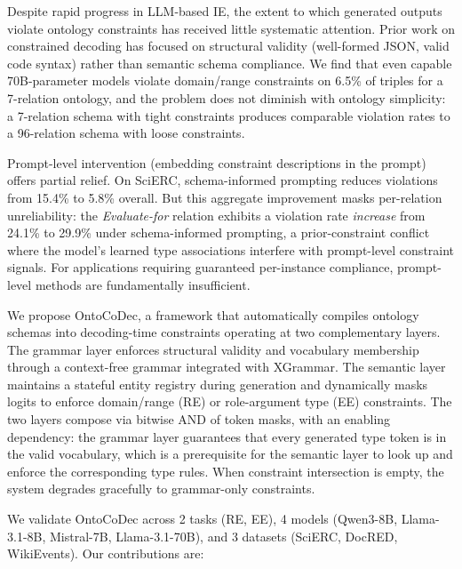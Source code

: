 \documentclass[11pt,a4paper]{article}
\newcommand{\ours}{OntoCoDec}
\begin{document}
Despite rapid progress in LLM-based IE, the extent to which generated outputs violate ontology constraints has received little systematic attention. Prior work on constrained decoding has focused on structural validity (well-formed JSON, valid code syntax) rather than semantic schema compliance. We find that even capable 70B-parameter models violate domain/range constraints on 6.5\% of triples for a 7-relation ontology, and the problem does not diminish with ontology simplicity: a 7-relation schema with tight constraints produces comparable violation rates to a 96-relation schema with loose constraints.

Prompt-level intervention (embedding constraint descriptions in the prompt) offers partial relief. On SciERC, schema-informed prompting reduces violations from 15.4\% to 5.8\% overall. But this aggregate improvement masks per-relation unreliability: the \textit{Evaluate-for} relation exhibits a violation rate \textit{increase} from 24.1\% to 29.9\% under schema-informed prompting, a prior-constraint conflict where the model's learned type associations interfere with prompt-level constraint signals. For applications requiring guaranteed per-instance compliance, prompt-level methods are fundamentally insufficient.

We propose \ours{}, a framework that automatically compiles ontology schemas into decoding-time constraints operating at two complementary layers. The grammar layer enforces structural validity and vocabulary membership through a context-free grammar integrated with XGrammar. The semantic layer maintains a stateful entity registry during generation and dynamically masks logits to enforce domain/range (RE) or role-argument type (EE) constraints. The two layers compose via bitwise AND of token masks, with an enabling dependency: the grammar layer guarantees that every generated type token is in the valid vocabulary, which is a prerequisite for the semantic layer to look up and enforce the corresponding type rules. When constraint intersection is empty, the system degrades gracefully to grammar-only constraints.

We validate \ours{} across 2 tasks (RE, EE), 4 models (Qwen3-8B, Llama-3.1-8B, Mistral-7B, Llama-3.1-70B), and 3 datasets (SciERC, DocRED, WikiEvents). Our contributions are:
\end{document}
